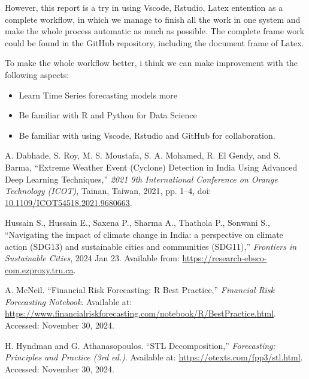 \documentclass[12pt]{article}
\begin{document}
However, this report is a try in using Vscode, Rstudio, Latex entention as a complete
workflow, in which we manage to finish all the work in one system and make the
whole process automatic as much as possible. The complete frame work could be found in the GitHub
repository, including the document frame of Latex.

To make the whole workflow better, i think we can make improvement with the following
aspects:
\begin{itemize}
    \item Learn Time Series forecasting models more
    \item Be familiar with R and Python for Data Science
    \item Be familiar with using Vscode, Rstudio and GitHub for collaboration.
\end{itemize}

\clearpage
\begin{thebibliography}{99} %

    A. Dabhade, S. Roy, M. S. Moustafa, S. A. Mohamed, R. El Gendy, and S. Barma, 
    ``Extreme Weather Event (Cyclone) Detection in India Using Advanced Deep Learning Techniques,'' 
    \textit{2021 9th International Conference on Orange Technology (ICOT)}, 
    Tainan, Taiwan, 2021, pp. 1--4, 
    doi: \href{https://doi.org/10.1109/ICOT54518.2021.9680663}{10.1109/ICOT54518.2021.9680663}.

    Hussain S., Hussain E., Saxena P., Sharma A., Thathola P., Sonwani S., 
    ``Navigating the impact of climate change in India: a perspective on climate action (SDG13) and sustainable cities and communities (SDG11),'' 
    \textit{Frontiers in Sustainable Cities}, 2024 Jan 23. 
    Available from: 
    \href{https://research-ebsco-com.ezproxy.tru.ca/linkprocessor/plink?id=6c6991da-78bd-3062-a586-5a5d83ba7467}{https://research-ebsco-com.ezproxy.tru.ca}.

    A. McNeil. 
    ``Financial Risk Forecasting: R Best Practice,'' 
    \textit{Financial Risk Forecasting Notebook}. 
    Available at: \url{https://www.financialriskforecasting.com/notebook/R/BestPractice.html}. 
    Accessed: November 30, 2024.

    H. Hyndman and G. Athanasopoulos. 
    ``STL Decomposition,'' 
    \textit{Forecasting: Principles and Practice (3rd ed.)}. 
    Available at: \url{https://otexts.com/fpp3/stl.html}. 
    Accessed: November 30, 2024.

\end{thebibliography}







\end{document}
